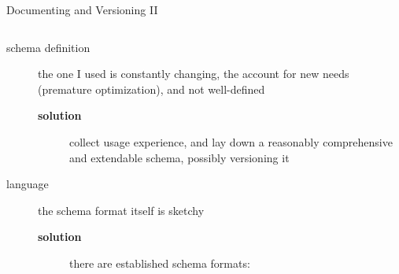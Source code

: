 \documentclass[9pt]{beamer}
\begin{document}
\begin{frame}[fragile]{Documenting and Versioning II}
\begin{columns}
\begin{column}{0.5\textwidth}
            \begin{description}
                \item[schema definition] the one I used is constantly changing,
                    the account for new needs (premature optimization), and not
                    well-defined
                    \begin{description}
                        \item[\textbf{solution}] collect usage experience, and
                            lay down a reasonably comprehensive and extendable
                            schema, possibly versioning it
                    \end{description}
                \item[language] the schema format itself is sketchy
                    \begin{description}
                        \item[\textbf{solution}] there are established schema formats:
                        \begin{columns}
                            \begin{column}{0.2\textwidth}
                            \end{column}
                            \begin{column}{0.15\textwidth}
                                \vspace*{5pt}


\end{column}
\end{columns}
\end{description}
\end{description}
\end{column}
\end{columns}
\end{frame}
\end{document}
